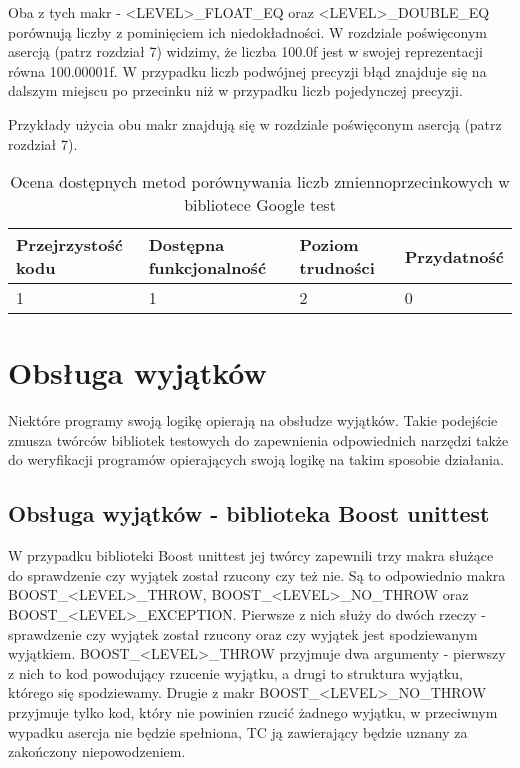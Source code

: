 \documentclass[12pt,a4paper,notitlepage]{report}
\begin{document}
Oba z tych makr - <LEVEL>{\_}FLOAT{\_}EQ oraz <LEVEL>{\_}DOUBLE{\_}EQ porównują liczby z pominięciem ich niedokładności. W rozdziale poświęconym asercją (patrz rozdział 7) widzimy, że liczba 100.0f jest w swojej reprezentacji równa 100.00001f. W przypadku liczb podwójnej precyzji błąd znajduje się na dalszym miejscu po przecinku niż w przypadku liczb pojedynczej precyzji.

Przykłady użycia obu makr znajdują się w rozdziale poświęconym asercją (patrz rozdział 7).

\begin{center}
			\begin{table}[!ht]
			\caption{Ocena dostępnych metod porównywania liczb zmiennoprzecinkowych w bibliotece Google test}
			\label{}
			\begin{tabular}[!hc]{|l|l|l|l|}
		\hline
		Przejrzystość kodu 	&	Dostępna funkcjonalność	&	Poziom trudności	&	Przydatność \\ \hline
		1					&	1						&	2					& 	0  			\\ \hline
			\end{tabular}
			\end{table} 
		\end{center}

\chapter{Obsługa wyjątków}

Niektóre programy swoją logikę opierają na obsłudze wyjątków. Takie podejście zmusza twórców bibliotek testowych do zapewnienia odpowiednich narzędzi także do weryfikacji programów opierających swoją logikę na takim sposobie działania. 

\section{Obsługa wyjątków - biblioteka Boost unittest}

W przypadku biblioteki Boost unittest jej twórcy zapewnili trzy makra służące do sprawdzenie czy wyjątek został rzucony czy też nie. Są to odpowiednio makra BOOST{\_}<LEVEL>{\_}THROW, BOOST{\_}<LEVEL>{\_}NO{\_}THROW oraz BOOST{\_}<LEVEL>{\_}EXCEPTION. Pierwsze z nich służy do dwóch rzeczy - sprawdzenie czy wyjątek został rzucony oraz czy wyjątek jest spodziewanym wyjątkiem. BOOST{\_}<LEVEL>{\_}THROW przyjmuje dwa argumenty - pierwszy z nich to kod powodujący rzucenie wyjątku, a drugi to struktura wyjątku, którego się spodziewamy. 
Drugie z makr BOOST{\_}<LEVEL>{\_}NO{\_}THROW przyjmuje tylko kod, który nie powinien rzucić żadnego wyjątku, w przeciwnym wypadku asercja nie będzie spełniona, TC ją zawierający będzie uznany za zakończony niepowodzeniem.
\end{document}
